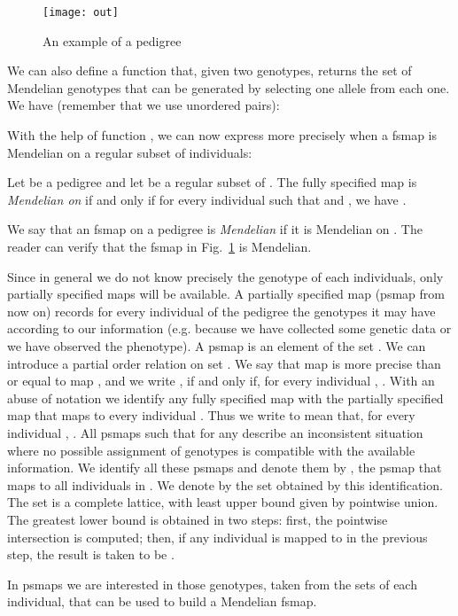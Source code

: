 \begin{figure}
  \centering
  \texttt{[image: out]}
  \caption{An example of a pedigree}
  \label{fig:OUT}
\end{figure}


We can also define a function
 that, given two
genotypes, returns the set of Mendelian genotypes that can be generated by
selecting one allele from each one. We have (remember that we use unordered
pairs):

With the help of function , we can now express more precisely when a
fsmap is Mendelian on a regular subset of individuals:
\begin{definition}
  Let  be a pedigree and let  be a regular subset of .
  The fully specified map  is {\em Mendelian on } if and only if for every individual
   such that  and , we have .
\end{definition}
We say that an fsmap  on a pedigree  is {\em Mendelian} if it
is Mendelian on . The reader can verify that the fsmap in Fig.~\ref{fig:OUT} is Mendelian.

Since in general we do not know precisely the genotype of each individuals, only
partially specified maps will be available. A partially specified map  (psmap from now on)
records for every individual of the pedigree the genotypes it may have according
to our information (e.g. because we have collected some genetic data or we have
observed the phenotype). A psmap  is an element of the set
. We can introduce a partial
order relation  on set . We say that map 
is more precise than or equal to map , and we write ,
if and only if, for every individual , .
With an abuse of notation we identify any fully specified map 
with the partially specified map that maps  to every individual
.
Thus we write  to mean that, for every individual , . 
All psmaps such that  for any  describe an inconsistent situation
where no possible assignment of genotypes is compatible with the available information.
We identify all these psmaps and denote them by ,
the psmap that maps  to all individuals in .
We denote by  the set obtained by this identification.
The set  is a complete lattice, with least upper bound  given
by pointwise union. 
The greatest lower bound  is obtained in two steps: first,
the pointwise intersection is computed; then, if any individual is mapped to 
in the previous step, the result is taken to be .

In psmaps we are interested in those genotypes, taken from the sets of 
each individual, that can be used to build a Mendelian fsmap.

